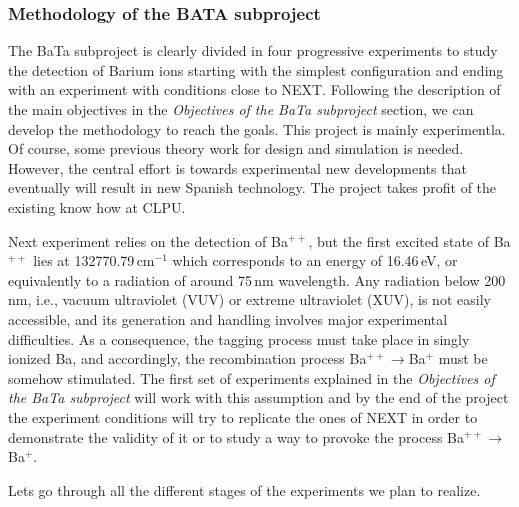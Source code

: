 
\subsubsection*{Methodology of the BATA subproject}
The BaTa subproject is clearly divided in four progressive experiments to study the detection of Barium ions starting with the simplest configuration and ending with an experiment with conditions close to NEXT. Following the description of the main objectives in the \emph{Objectives of the BaTa subproject} section, we can develop the methodology to reach the goals. This project is mainly experimentla. Of course, some previous theory work for design and simulation is needed. However, the central effort is towards experimental new developments that eventually will result in new Spanish technology. The project takes profit of the existing know how at CLPU.

Next experiment relies on the detection of Ba$^{++}$, but the first excited state of Ba$^{++}$ lies at 132770.79\,cm$^{-1}$ which corresponds to an energy of 16.46\,eV, or equivalently to a radiation of around 75\,nm wavelength. Any radiation below 200\,nm, i.e., vacuum ultraviolet (VUV) or extreme ultraviolet (XUV), is not easily accessible, and its generation and handling involves major experimental difficulties. As a consequence, the tagging process must take place in singly ionized Ba, and accordingly, the recombination process Ba$^{++}\rightarrow$Ba$^{+}$ must be somehow stimulated. The first set of experiments explained in the \emph{Objectives of the BaTa subproject} will work with this assumption and by the end of the project the experiment conditions will try to replicate the ones of NEXT in order to demonstrate the validity of it or to study a way to provoke the process Ba$^{++}\rightarrow$Ba$^{+}$.

Lets go through all the different stages of the experiments we plan to realize.


